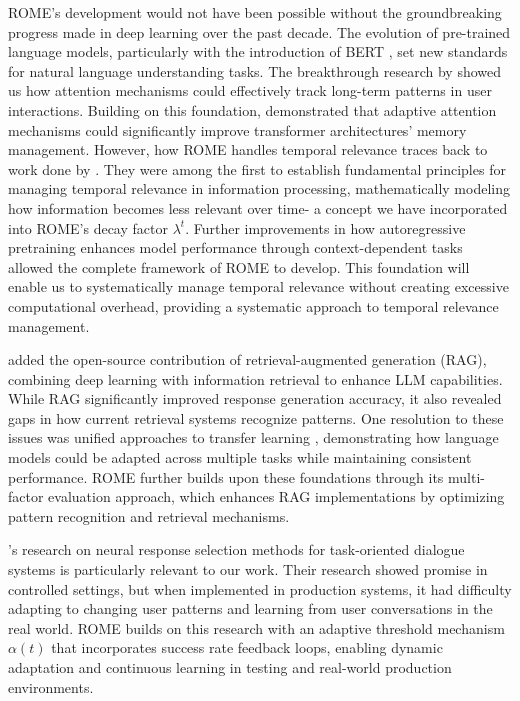 \documentclass[12pt]{article}
\begin{document}
ROME's development would not have been possible without the groundbreaking progress made in deep learning over the past decade. The evolution of pre-trained language models, particularly with the introduction of BERT \citep{devlin2019}, set new standards for natural language understanding tasks. The breakthrough research by \citet{vaswani2017} showed us how attention mechanisms could effectively track long-term patterns in user interactions. Building on this foundation, \citet{sukhbaatar2019} demonstrated that adaptive attention mechanisms could significantly improve transformer architectures' memory management. However, how ROME handles temporal relevance traces back to work done by \citet{li2003}. They were among the first to establish fundamental principles for managing temporal relevance in information processing, mathematically modeling how information becomes less relevant over time- a concept we have incorporated into ROME's decay factor $\lambda^t$. Further improvements in how autoregressive pretraining \citep{yang2019} enhances model performance through context-dependent tasks allowed the complete framework of ROME to develop. This foundation will enable us to systematically manage temporal relevance without creating excessive computational overhead, providing a systematic approach to temporal relevance management.

\citet{lewis2020} added the open-source contribution of retrieval-augmented generation (RAG), combining deep learning with information retrieval to enhance LLM capabilities. While RAG significantly improved response generation accuracy, it also revealed gaps in how current retrieval systems recognize patterns. One resolution to these issues was unified approaches to transfer learning \citep{raffel2020}, demonstrating how language models could be adapted across multiple tasks while maintaining consistent performance. ROME further builds upon these foundations through its multi-factor evaluation approach, which enhances RAG implementations by optimizing pattern recognition and retrieval mechanisms.

\citet{henderson2019}'s research on neural response selection methods for task-oriented dialogue systems is particularly relevant to our work. Their research showed promise in controlled settings, but when implemented in production systems, it had difficulty adapting to changing user patterns and learning from user conversations in the real world. ROME builds on this research with an adaptive threshold mechanism $\alpha(t)$ that incorporates success rate feedback loops, enabling dynamic adaptation and continuous learning in testing and real-world production environments.
\end{document}
